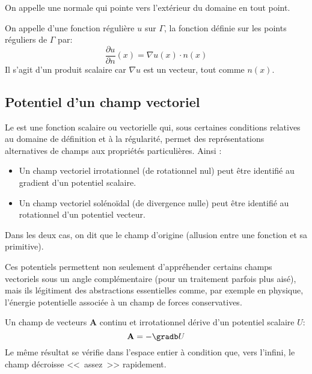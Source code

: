 \medskip
On appelle  une normale qui pointe vers
l'extérieur du domaine en tout point.

\medskip
\begin{definition}
On appelle  d'une fonction régulière $u$
sur $\Gamma$, la fonction définie sur les points réguliers de $\Gamma$ par:
\begin{equation}\dfrac{\partial u}{\partial n}(x)=\nabla u(x)\cdot n(x)\end{equation} Il s'agit d'un produit
scalaire car $\nabla u$ est un vecteur, tout comme $n(x)$.
\end{definition}

\medskip
\subsection{Potentiel d'un champ vectoriel}

Le  est une fonction scalaire ou vectorielle qui,
sous certaines conditions relatives au domaine de définition et à la régularité,
permet des représentations alternatives de champs aux propriétés particulières.
Ainsi :
\begin{itemize}
   \item Un champ vectoriel irrotationnel (de rotationnel nul) peut être identifié au gradient d'un potentiel scalaire.
   \item Un champ vectoriel solénoïdal (de divergence nulle) peut être identifié au rotationnel d'un potentiel vecteur.
\end{itemize}
Dans les deux cas, on dit que le champ d'origine 
(allusion entre une fonction et sa primitive).

\medskip
Ces potentiels permettent non seulement d'appréhender certains champs vectoriels sous un angle
complémentaire (pour un traitement parfois plus aisé), mais ils légitiment des abstractions essentielles
comme, par exemple en physique, l'énergie potentielle associée à un champ de forces conservatives.

\medskip
Un champ de vecteurs $\mathbf{A} $ continu et irrotationnel dérive d'un potentiel scalaire $U$:
\begin{equation}
 \mathbf{A} = -\gradb U
\end{equation}
Le même résultat se vérifie dans l'espace entier à condition que, vers l'infini, le champ
décroisse <<~assez~>> rapidement.

